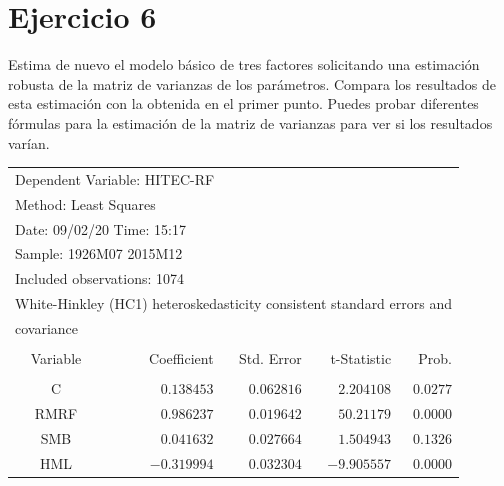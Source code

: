 \documentclass[12pt]{article}
\numberwithin{equation}{section} %
\begin{document}
\section{Ejercicio 6} Estima de nuevo el modelo básico de tres factores solicitando una estimación robusta de la matriz de varianzas de los parámetros. Compara los resultados de esta estimación con la obtenida en el primer punto. Puedes probar diferentes fórmulas para la estimación de la matriz de varianzas para ver si los resultados varían.

\begin{table}[H]
\centering
\begin{tabular}{lrrrr}
\multicolumn{3}{l}{Dependent Variable: HITEC-RF}&\multicolumn{1}{c}{}&\multicolumn{1}{c}{}\\
\multicolumn{2}{l}{Method: Least Squares}&\multicolumn{1}{c}{}&\multicolumn{1}{c}{}&\multicolumn{1}{c}{}\\
\multicolumn{2}{l}{Date: 09/02/20   Time: 15:17}&\multicolumn{1}{c}{}&\multicolumn{1}{c}{}&\multicolumn{1}{c}{}\\
\multicolumn{2}{l}{Sample: 1926M07 2015M12}&\multicolumn{1}{c}{}&\multicolumn{1}{c}{}&\multicolumn{1}{c}{}\\
\multicolumn{3}{l}{Included observations: 1074}&\multicolumn{1}{c}{}&\multicolumn{1}{c}{}\\
\multicolumn{5}{l}{White-Hinkley (HC1) heteroskedasticity consistent standard errors and}\\
\multicolumn{2}{l}{covariance}&\multicolumn{1}{c}{}&\multicolumn{1}{c}{}&\multicolumn{1}{c}{}\\
[4.5pt] \hline \\ [-4.5pt]
\multicolumn{1}{c}{Variable}&\multicolumn{1}{r}{Coefficient}&\multicolumn{1}{r}{Std. Error}&\multicolumn{1}{r}{t-Statistic}&\multicolumn{1}{r}{Prob.}\\
[4.5pt] \hline \\ [-4.5pt]
\multicolumn{1}{c}{C}&\multicolumn{1}{r}{$0.138453$}&\multicolumn{1}{r}{$0.062816$}&\multicolumn{1}{r}{$2.204108$}&\multicolumn{1}{r}{$0.0277$}\\
\multicolumn{1}{c}{RMRF}&\multicolumn{1}{r}{$0.986237$}&\multicolumn{1}{r}{$0.019642$}&\multicolumn{1}{r}{$50.21179$}&\multicolumn{1}{r}{$0.0000$}\\
\multicolumn{1}{c}{SMB}&\multicolumn{1}{r}{$0.041632$}&\multicolumn{1}{r}{$0.027664$}&\multicolumn{1}{r}{$1.504943$}&\multicolumn{1}{r}{$0.1326$}\\
\multicolumn{1}{c}{HML}&\multicolumn{1}{r}{$-0.319994$}&\multicolumn{1}{r}{$0.032304$}&\multicolumn{1}{r}{$-9.905557$}&\multicolumn{1}{r}{$0.0000$}\\

\end{tabular}
\end{table}
\end{document}
